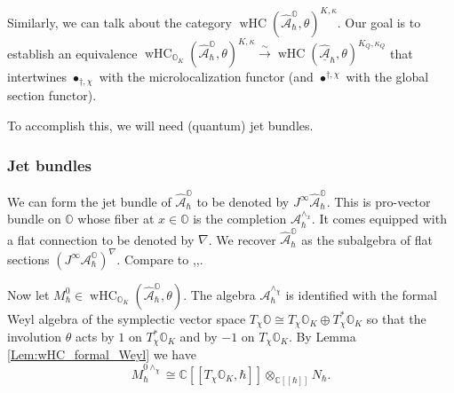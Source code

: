 \documentclass[12pt]{amsart}
\newcommand{\C}{\mathbb{C}}
\newcommand{\A}{\mathcal{A}}
\newcommand{\Orb}{\mathbb{O}}
\newcommand{\jet}{J^\infty}
\newcommand{\wHC}{\operatorname{wHC}}
\newtheorem{Lem}[Thm]{Lemma}
\theoremstyle{definition}
\numberwithin{equation}{section}
\begin{document}
Similarly, we can talk about the category $\wHC(\hat{\A}_\hbar^\Orb,\theta)^{K,\kappa}$.
Our goal is to  establish an equivalence $\wHC_{\Orb_K}(\hat{\A}_\hbar^{\Orb},\theta)^{K,\kappa}
\xrightarrow{\sim} \wHC(\underline{\hat{\A}}_\hbar,\theta)^{K_Q,\kappa_Q}$ that intertwines
$\bullet_{\dagger,\chi}$ with the microlocalization functor (and
$\bullet^{\dagger,\chi}$ with the global section functor).

To accomplish this, we will need (quantum) jet bundles.

\subsubsection{Jet bundles}
We can form the jet bundle of $\hat{\A}_\hbar^{\Orb}$ to be denoted
by $\jet \hat{\A}_\hbar^{\Orb}$. This is pro-vector bundle on $\Orb$ whose fiber at $x\in \Orb$
is the completion $\A_{\hbar}^{\wedge_x}$. It comes equipped with a flat connection to be
denoted by $\nabla$. We recover $\hat{\A}_{\hbar}^{\Orb}$ as the subalgebra of flat sections
$(\jet \A_\hbar^{\Orb})^\nabla$. Compare to \cite[Section 3.2]{BK},\cite[Section 3.2]{1dim_quant},\cite[Section 2.6]{HC_symp}.

Now let $M_\hbar^0\in \wHC_{\Orb_K}(\hat{\A}_{\hbar}^{\Orb},\theta)$.
The algebra $\A_\hbar^{\wedge_\chi}$ is identified with the formal Weyl algebra of the symplectic vector space $T_\chi\Orb\cong T_\chi\Orb_K\oplus T^*_\chi\Orb_K$
so that the involution $\theta$ acts by $1$ on $T^*_\chi\Orb_K$
and by $-1$ on $T_\chi \Orb_K$. By Lemma
\ref{Lem:wHC_formal_Weyl} we have
\begin{equation}\label{eq:wHC_decomp}
M_\hbar^{0\wedge_\chi}\cong \C[[T_\chi\Orb_K,\hbar]]\otimes_{\C[[\hbar]]}N_\hbar.
\end{equation}

%
\end{document}
